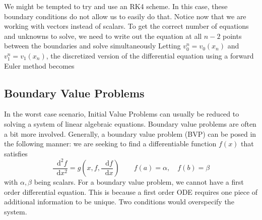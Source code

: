\documentclass[]{article}
\theoremstyle{definition}
\newcommand*\diff{\mathop{}\!\mathrm{d}}
\numberwithin{equation}{section}
\begin{document}
We might be tempted to try and use an RK4 scheme. In this case, these boundary conditions do not allow us to easily do that. Notice now that we are working with vectors instead of scalars. To get the correct number of equations and unknowns to solve, we need to write out the equation at all $n-2$ points between the boundaries and solve simultaneously Letting $v_0^n = v_0(x_n)$ and $v_1^n = v_1(x_n)$, the discretized version of the differential equation using a forward Euler method becomes
	\subsection{Boundary Value Problems}
In the worst case scenario, Initial Value Problems can usually be reduced to solving a system of linear algebraic equations. Boundary value problems are often a bit more involved. Generally, a boundary value problem (BVP) can be posed in the following manner: we are seeking to find a differentiable function $f(x)$ that satisfies 
\begin{equation}
\frac{\diff^2 f}{\diff x^2} = g \left(x, f, \frac{\diff f}{\diff x}\right) \qquad f(a) = \alpha, \quad f(b) = \beta \label{eq:bvp1}
\end{equation}
 with $\alpha,\beta$ being scalars. For a boundary value problem, we cannot have a first order differential equation. This is because a first order ODE requires one piece of additional information to be unique. Two conditions would overspecify the system. 
\end{document}
